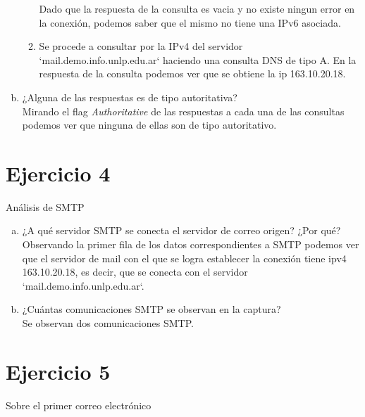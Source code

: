 \documentclass[osajnl,twocolumn,showpacs,superscriptaddress,10pt]{revtex4-1} %
\begin{document}
\begin{enumerate}[a)]
\begin{enumerate}[1.]
    Dado que la respuesta de la consulta es vacia y no existe ningun error en la conexión, podemos saber que el mismo no tiene una IPv6 asociada. \\

    \item Se procede a consultar por la IPv4 del servidor `mail.demo.info.unlp.edu.ar` haciendo una consulta DNS de tipo A. En la respuesta de la consulta podemos ver que se obtiene la ip 163.10.20.18. \\
  \end{enumerate}

  \item ¿Alguna de las respuestas es de tipo autoritativa? \\

  Mirando el flag \textit{Authoritative} de las respuestas a cada una de las consultas podemos ver que ninguna de ellas son de tipo autoritativo.
\end{enumerate}

\section{Ejercicio 4}

Análisis de SMTP

\begin{enumerate}[a)]
  \item ¿A qué servidor SMTP se conecta el servidor de correo origen? ¿Por qué? \\

  Observando la primer fila de los datos correspondientes a SMTP podemos ver que el servidor de mail con el que se logra establecer la conexión tiene ipv4 163.10.20.18, es decir, que se conecta con el servidor `mail.demo.info.unlp.edu.ar`. \\

  \item ¿Cuántas comunicaciones SMTP se observan en la captura? \\

  Se observan dos comunicaciones SMTP.
\end{enumerate}

\section{Ejercicio 5}

Sobre el primer correo electrónico
\end{document}
